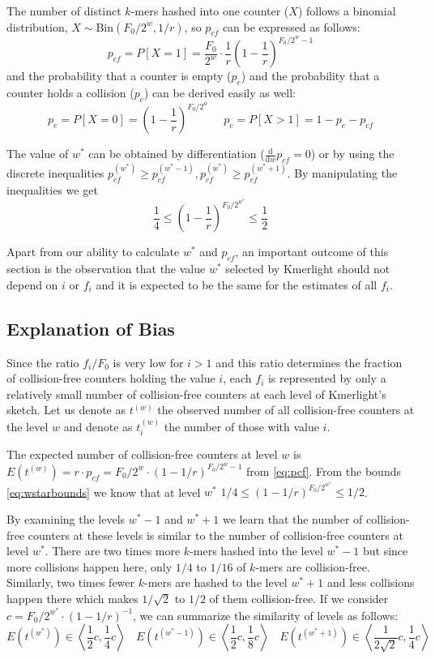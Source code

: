 The number of distinct $k$-mers hashed into one counter ($X$) follows a binomial distribution, $X \sim \mathrm{Bin}(F_0/2^w, 1/r)$, so $p_{cf}$ can be expressed as follows:
\begin{equation} \label{eq:pcf}
p_{cf} = P[X=1] = \frac{F_0}{2^w} \cdot \frac{1}{r} \left(1 - \frac{1}{r}\right)^{F_0/2^w - 1}
\end{equation}
and the probability that a counter is empty ($p_e$) and the probability that a counter holds a collision ($p_c$) can be derived easily as well:
$$p_e = P[X=0] = \left(1 - \frac{1}{r}\right)^{F_0/2^w} ~~~~~~ p_c = P[X>1] = 1 - p_e - p_{cf}$$

The value of $w^*$ can be obtained by differentiation ($\frac{\mathrm{d}}{\mathrm{d}w}p_{cf} = 0$) or by using the discrete inequalities 
$p_{cf}^{(w^*)} \geq p_{cf}^{(w^*-1)}, p_{cf}^{(w^*)} \geq p_{cf}^{(w^*+1)}$. 
By manipulating the inequalities we get
\begin{equation} \label{eq:wstarbounds}
\frac{1}{4} \leq \left(1 - \frac{1}{r}\right)^{F_0/2^{w^*}} \leq \frac{1}{2}
\end{equation}

\medskip

Apart from our ability to calculate $w^*$ and $p_{cf}$, an important outcome of
this section is the observation that the value $w^*$ selected by Kmerlight should not
depend on $i$ or $f_i$ and it is expected to be the same for the estimates of all $f_i$.

\subsection{Explanation of Bias}
Since the ratio $f_i / F_0$ is very low for $i>1$ and this ratio determines
the fraction of collision-free counters holding the value $i$, each $f_i$ is
represented by only a relatively small number of collision-free counters at each level of 
Kmerlight's sketch. Let us denote as $t^{(w)}$ the observed number of all collision-free
counters at the level $w$ and denote as $t_i^{(w)}$ the number of those with value $i$.

The expected number of collision-free counters at level $w$ is 
$E(t^{(w)}) = r \cdot p_{cf} = F_0 / 2^w \cdot (1 - 1/r)^{F_0/2^w - 1}$ from \ref{eq:pcf}.
From the bounds \ref{eq:wstarbounds} we know that at level $w^*$
$1/4 \leq (1 - 1/r)^{F_0/2^{w^*}} \leq 1/2$.

By examining the levels $w^*-1$ and $w^*+1$ we learn that the number of collision-free
counters at these levels is similar to the number of collision-free counters at level $w^*$. 
There are two times more $k$-mers hashed into the level $w^*-1$ but since more collisions
happen here, only $1/4$ to $1/16$ of $k$-mers are collision-free. Similarly, two times fewer
$k$-mers are hashed to the level $w^*+1$ and less collisions happen there which makes 
$1/\sqrt{2}$ to $1/2$ of them collision-free. If we consider $c = F_0/2^{w^*} \cdot (1-1/r)^{-1}$,
we can summarize the similarity of levels as follows:
$$E(t^{(w^*)}) \in \left\langle \frac{1}{2}c, \frac{1}{4}c  \right\rangle ~~~~
E(t^{(w^*-1)}) \in \left\langle \frac{1}{2}c, \frac{1}{8}c  \right\rangle ~~~~
E(t^{(w^*+1)}) \in \left\langle \frac{1}{2\sqrt{2}}c, \frac{1}{4}c  \right\rangle
$$

